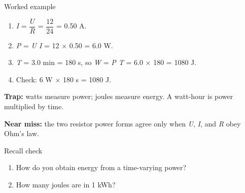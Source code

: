 \documentclass[11pt]{article}
\begin{document}
\begin{keepsection}
\begin{workedbox}{Worked example}
\begin{enumerate}
\item \textit{I} = {\small\ensuremath{\dfrac{{U}}{{R}}}} = {\small\ensuremath{\dfrac{12}{24}}} = 0.50 A.
\item \textit{P} = \textit{U I} = 12 \ensuremath{\times} 0.50 = 6.0 W.
\item \textit{T} = 3.0 min = 180 s, so \textit{W} = \textit{P T} = 6.0 \ensuremath{\times} 180 = 1080 J.
\item Check: 6 W \ensuremath{\times} 180 s = 1080 J.
\end{enumerate}
\end{workedbox}

\begin{notebox}\textbf{Trap:} watts measure power; joules measure energy. A watt-hour is power multiplied by time.\end{notebox}

\begin{notebox}\textbf{Near miss:} the two resistor power forms agree only when \textit{U}, \textit{I}, and \textit{R} obey Ohm’s law.\end{notebox}

\begin{recallbox}{Recall check}
\begin{enumerate}
\item How do you obtain energy from a time-varying power?
\item How many joules are in 1 kWh?
\end{enumerate}

\end{recallbox}
\end{keepsection}
\end{document}
